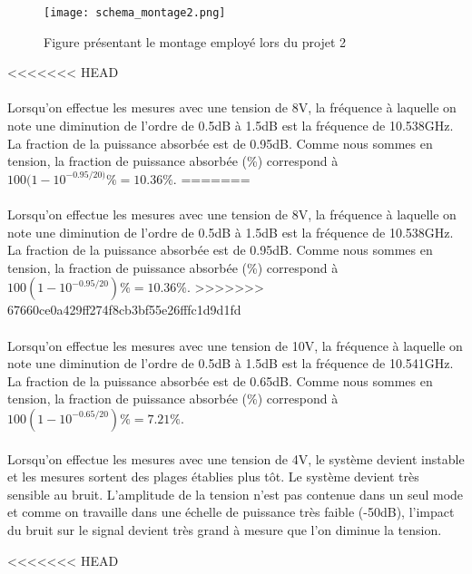 \begin{figure}
\centering
\texttt{[image: schema\_montage2.png]}
\caption{Figure présentant le montage employé lors du projet 2}
\label{f:fig4}
\end{figure}

<<<<<<< HEAD
\paragraph{}Lorsqu'on effectue les mesures avec une tension de 8V, la fréquence à laquelle on note une diminution de l'ordre de 0.5dB à 1.5dB est la fréquence de 10.538GHz. La fraction de la puissance absorbée est de 0.95dB. Comme nous sommes en tension, la fraction de puissance absorbée (\%) correspond à  $100(1- 10^{-0.95/20)}\% = 10.36\%$.
=======
\paragraph{}Lorsqu'on effectue les mesures avec une tension de 8V, la fréquence à laquelle on note une diminution de l'ordre de 0.5dB à 1.5dB est la fréquence de 10.538GHz. La fraction de la puissance absorbée est de 0.95dB. Comme nous sommes en tension, la fraction de puissance absorbée (\%) correspond à  $100(1- 10^{-0.95/20})\% = 10.36\%$.
>>>>>>> 67660ce0a429ff274f8cb3bf55e26fffc1d9d1fd

\paragraph{}Lorsqu'on effectue les mesures avec une tension de 10V, la fréquence à laquelle on note une diminution de l'ordre de 0.5dB à 1.5dB est la fréquence de 10.541GHz. La fraction de la puissance absorbée est de 0.65dB. Comme nous sommes en tension, la fraction de puissance absorbée (\%) correspond à  $100(1- 10^{-0.65/20})\% = 7.21\%$.

\paragraph{}Lorsqu'on effectue les mesures avec une tension de 4V, le système devient instable et les mesures sortent des plages établies plus tôt. Le système devient très sensible au bruit. L'amplitude de la tension n'est pas contenue dans un seul mode et comme on travaille dans une échelle de puissance très faible (-50dB), l'impact du bruit sur le signal devient très grand à mesure que l'on diminue la tension.

<<<<<<< HEAD
